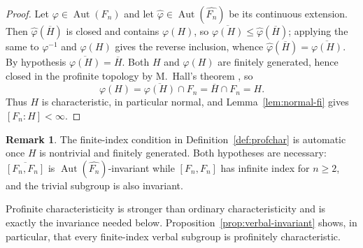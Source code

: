 \documentclass[11pt]{amsart}
\theoremstyle{plain}
\theoremstyle{definition}
\newtheorem{remark}[theorem]{Remark}
\newcommand{\Aut}{\operatorname{Aut}}
\begin{document}
\begin{proof}
Let $\varphi\in\Aut(F_n)$ and let $\widehat\varphi\in\Aut(\widehat{F_n})$ be its
continuous extension.  Then $\widehat\varphi(\overline H)$ is closed and contains
$\varphi(H)$, so $\overline{\varphi(H)}\le\widehat\varphi(\overline H)$; applying
the same to $\varphi^{-1}$ and $\varphi(H)$ gives the reverse inclusion, whence
$\widehat\varphi(\overline H)=\overline{\varphi(H)}$.  By hypothesis
$\overline{\varphi(H)}=\overline H$.  Both $H$ and $\varphi(H)$ are finitely
generated, hence closed in the profinite topology by M.~Hall's theorem
\cite{Hall}, so
\[
  \varphi(H)=\overline{\varphi(H)}\cap F_n=\overline H\cap F_n=H .
\]
Thus $H$ is characteristic, in particular normal, and
Lemma~\ref{lem:normal-fi} gives $[F_n:H]<\infty$.
\end{proof}

\begin{remark}\label{rmk:fi-automatic}
The finite-index condition in Definition~\ref{def:profchar} is automatic once
$H$ is nontrivial and finitely generated. Both hypotheses are necessary:
$\overline{[F_n,F_n]}$ is $\Aut(\widehat{F_n})$-invariant while
$[F_n,F_n]$ has infinite index for $n\ge2$, and the trivial subgroup is also
invariant.
\end{remark}

Profinite characteristicity is stronger than ordinary characteristicity and is
exactly the invariance needed below. Proposition~\ref{prop:verbal-invariant}
shows, in particular, that every finite-index verbal subgroup is profinitely
characteristic.
\end{document}
